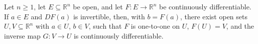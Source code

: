 Let \(n\geq1\), let \(E\subseteq\mathbb R^n\) be open, and let \(F:E\to\mathbb R^n\) be continuously differentiable. If \(a\in E\) and \(DF(a)\) is invertible, then, with \(b=F(a)\), there exist open sets \(U,V\subseteq\mathbb R^n\) with \(a\in U\), \(b\in V\), such that \(F\) is one-to-one on \(U\), \(F(U)=V\), and the inverse map \(G:V\to U\) is continuously differentiable.